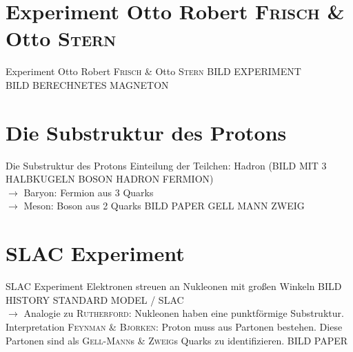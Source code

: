 \documentclass[t,9pt]{beamer}
\begin{document}
        \section{Experiment Otto Robert \textsc{Frisch} \& Otto \textsc{Stern}} 
        \begin{frame}{Experiment Otto Robert \textsc{Frisch} \& Otto \textsc{Stern}} 
                BILD EXPERIMENT\\BILD BERECHNETES MAGNETON
        \end{frame}

        \section{Die Substruktur des Protons}
        \begin{frame}{Die Substruktur des Protons}
                Einteilung der Teilchen: Hadron (BILD MIT 3 HALBKUGELN BOSON HADRON FERMION)        
                \pause
                \\ $\rightarrow $ Baryon: Fermion aus 3 Quarks
                \\ $\rightarrow $ Meson: Boson aus 2 Quarks
                BILD PAPER GELL MANN ZWEIG
        \end{frame}

        \section{SLAC Experiment}
        \begin{frame}{SLAC Experiment}
                \pause
                Elektronen streuen an Nukleonen mit großen Winkeln BILD HISTORY STANDARD MODEL / SLAC
                \pause
                \\ $\rightarrow $ Analogie zu \textsc{Rutherford}: Nukleonen haben eine punktförmige Substruktur. 
                \pause
                \\ Interpretation \textsc{Feynman} \& \textsc{Bjorken}: Proton muss aus Partonen bestehen. Diese Partonen sind als \textsc{Gell-Mann}s \& \textsc{Zweig}s Quarks zu identifizieren. BILD PAPER
        \end{frame} 
\end{document}
